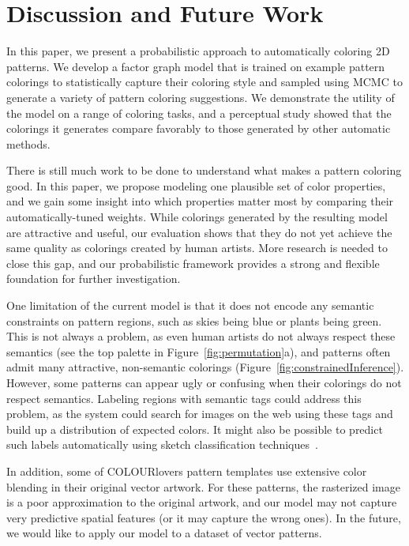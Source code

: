 \section{Discussion and Future Work}
\label{sec:discussion}

In this paper, we present a probabilistic approach to automatically coloring 2D patterns. We develop a factor graph model that is trained on example pattern colorings to statistically capture their coloring style and sampled using MCMC to generate a variety of pattern coloring suggestions. We demonstrate the utility of the model on a range of coloring tasks, and a perceptual study showed that the colorings it generates compare favorably to those generated by other automatic methods.

There is still much work to be done to understand what makes a pattern coloring good. In this paper, we propose modeling one plausible set of color properties, and we gain some insight into which properties matter most by comparing their automatically-tuned weights. While colorings generated by the resulting model are attractive and useful, our evaluation shows that they do not yet achieve the same quality as colorings created by human artists. More research is needed to close this gap, and our probabilistic framework provides a strong and flexible foundation for further investigation.

One limitation of the current model is that it does not encode any semantic constraints on pattern regions, such as skies being blue or plants being green. This is not always a problem, as even human artists do not always respect these semantics (see the top palette in Figure~\ref{fig:permutation}a), and patterns often admit many attractive, non-semantic colorings (Figure~\ref{fig:constrainedInference}). However, some patterns can appear ugly or confusing when their colorings do not respect semantics.
Labeling regions with semantic tags could address this problem, as the system could search for images on the web using these tags and build up a distribution of expected colors. It might also be possible to predict such labels automatically using sketch classification techniques~\cite{SketchClassification}.

In addition, some of COLOURlovers pattern templates use extensive color blending in their original vector artwork. For these patterns, the rasterized image is a poor approximation to the original artwork, and our model may not capture very predictive spatial features (or it may capture the wrong ones). In the future, we would like to apply our model to a dataset of vector patterns.

